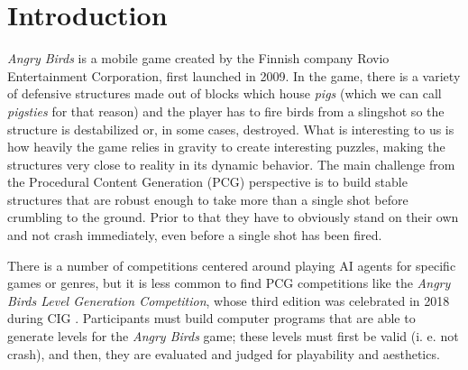 \documentclass[sigconf]{acmart}
\begin{document}



\maketitle

%
%
\section{Introduction}
\label{sec:intro}

\textit{Angry Birds} is a mobile game created by the Finnish company Rovio Entertainment 
Corporation\cite{angry-birds}, first launched in 2009. 
In the game, there is a variety of defensive structures made out of
blocks which house {\em pigs} (which we can call {\em pigsties} for
that reason)
and the player has to fire birds from a slingshot
so the structure is destabilized or, in some cases, destroyed.
What is interesting to us is how heavily the 
game relies in gravity to create interesting puzzles, making the
structures very close to reality in its dynamic behavior. The main challenge 
from 
the Procedural Content Generation (PCG) perspective is to build stable
structures that are robust enough to take more than a single shot
before crumbling to the ground. Prior to that they have to obviously
stand on their own and not crash immediately, even before a single
shot has been fired.

There is a number of competitions centered around playing AI agents for specific 
games or genres, but it is less common to find PCG competitions like the 
\textit{Angry Birds Level Generation Competition}, whose third edition
was celebrated in 2018 during CIG \cite{aibirds}.
Participants must build 
computer programs that are able to generate levels for the \textit{Angry Birds} 
game; these levels must first be valid (i. e. not crash), and then,
they are evaluated and judged for playability and aesthetics. 
\end{document}

